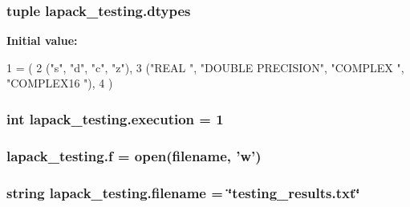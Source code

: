 \hypertarget{namespacelapack__testing_a38154b83ac1c2b82c82b8281944aa66e}{}
\subsubsection[{dtypes}]{\setlength{\rightskip}{0pt plus 5cm}tuple lapack\+\_\+testing.\+dtypes}\label{namespacelapack__testing_a38154b83ac1c2b82c82b8281944aa66e}
{\bfseries Initial value\+:}
\begin{DoxyCode}
1 = (
2 (\textcolor{stringliteral}{"s"}, \textcolor{stringliteral}{"d"}, \textcolor{stringliteral}{"c"}, \textcolor{stringliteral}{"z"}),
3 (\textcolor{stringliteral}{"REAL             "}, \textcolor{stringliteral}{"DOUBLE PRECISION"}, \textcolor{stringliteral}{"COMPLEX          "}, \textcolor{stringliteral}{"COMPLEX16         "}),
4 )
\end{DoxyCode}
\hypertarget{namespacelapack__testing_ad7e20095c10346b2012d859553653966}{}
\subsubsection[{execution}]{\setlength{\rightskip}{0pt plus 5cm}int lapack\+\_\+testing.\+execution = 1}\label{namespacelapack__testing_ad7e20095c10346b2012d859553653966}
\hypertarget{namespacelapack__testing_a1253c46dadde4ab0f214f59fda7810bb}{}
\subsubsection[{f}]{\setlength{\rightskip}{0pt plus 5cm}lapack\+\_\+testing.\+f = open({\bf filename}, 'w')}\label{namespacelapack__testing_a1253c46dadde4ab0f214f59fda7810bb}
\hypertarget{namespacelapack__testing_aa53400ed106a6e9deffab44779c74f7b}{}
\subsubsection[{filename}]{\setlength{\rightskip}{0pt plus 5cm}string lapack\+\_\+testing.\+filename = \char`\"{}testing\+\_\+results.\+txt\char`\"{}}\label{namespacelapack__testing_aa53400ed106a6e9deffab44779c74f7b}
\hypertarget{namespacelapack__testing_a4923c7b5aecf9d46dcb4675addd06912}{}
